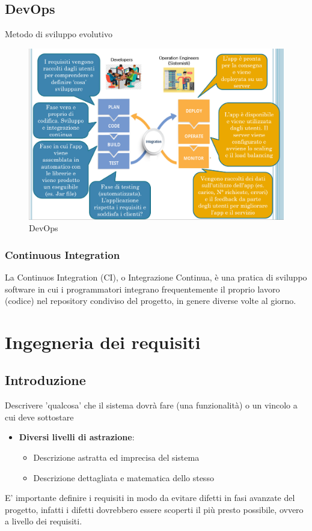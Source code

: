 \documentclass[12pt, a4paper]{report}
\begin{document}
\section{DevOps}
Metodo di sviluppo evolutivo
\begin{figure}[h]
    \centering
    \includegraphics[width=0.8\linewidth]{Immagini/devops.png}
    \caption{DevOps}
\end{figure}
\subsection{Continuous Integration}
La Continuos Integration (CI), o Integrazione Continua, è una pratica di sviluppo software in cui i programmatori integrano frequentemente il proprio lavoro (codice) nel repository condiviso del progetto, in genere diverse volte al giorno.
\chapter{Ingegneria dei requisiti}
\section{Introduzione}
Descrivere 'qualcosa' che il sistema dovrà fare (una funzionalità) o un vincolo a cui deve sottostare
\begin{itemize}
    \item \textbf{Diversi livelli di astrazione}:\begin{itemize}
        \item Descrizione astratta ed imprecisa del sistema
        \item Descrizione dettagliata e matematica dello stesso
    \end{itemize}
\end{itemize}
E' importante definire i requisiti in modo da evitare difetti in fasi avanzate del progetto, infatti i difetti dovrebbero essere scoperti il più presto possibile, ovvero a livello dei requisiti.
\end{document}
